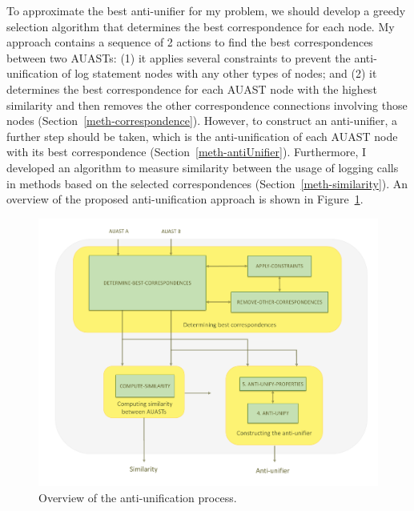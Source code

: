 To approximate the best anti-unifier for my problem, we should develop a greedy selection algorithm that determines the best correspondence for each node. My approach contains a sequence of 2 actions to find the best correspondences between two AUASTs: (1) it applies several constraints to prevent the anti-unification of log statement nodes with any other types of nodes; and (2) it determines the best correspondence for each AUAST node with the highest similarity and then removes the other correspondence connections involving those nodes (Section~\ref{meth-correspondence}). However, to construct an anti-unifier, a further step should be taken, which is the anti-unification of each AUAST node with its best correspondence (Section~\ref{meth-antiUnifier}). Furthermore, I developed an algorithm to measure similarity between the usage of logging calls in methods based on the selected correspondences (Section~\ref{meth-similarity}). An overview of the proposed anti-unification approach is shown in Figure~\ref{fig:meth_overview}.





\begin{figure} [H]
  \centering\includegraphics [width = \textwidth]{Drawing4/auOverview.pdf}
  \caption{Overview of the anti-unification process.}
  \label{fig:meth_overview}
\end{figure}


